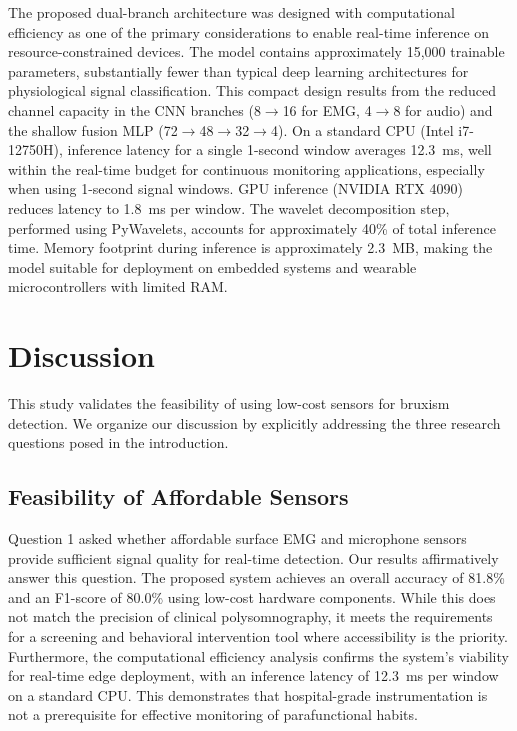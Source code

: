 \documentclass[acmtog, nonacm]{acmart}
\begin{document}
The proposed dual-branch architecture was designed with computational efficiency as one of the primary considerations to enable real-time inference on resource-constrained devices. The model contains approximately 15,000 trainable parameters, substantially fewer than typical deep learning architectures for physiological signal classification. This compact design results from the reduced channel capacity in the CNN branches (8$\rightarrow$16 for EMG, 4$\rightarrow$8 for audio) and the shallow fusion MLP (72$\rightarrow$48$\rightarrow$32$\rightarrow$4). On a standard CPU (Intel i7-12750H), inference latency for a single 1-second window averages 12.3~ms, well within the real-time budget for continuous monitoring applications, especially when using 1-second signal windows. GPU inference (NVIDIA RTX 4090) reduces latency to 1.8~ms per window. The wavelet decomposition step, performed using PyWavelets, accounts for approximately 40\% of total inference time. Memory footprint during inference is approximately 2.3~MB, making the model suitable for deployment on embedded systems and wearable microcontrollers with limited RAM.


\section{Discussion}

This study validates the feasibility of using low-cost sensors for bruxism detection. We organize our discussion by explicitly addressing the three research questions posed in the introduction.

\subsection{Feasibility of Affordable Sensors}
Question 1 asked whether affordable surface EMG and microphone sensors provide sufficient signal quality for real-time detection. Our results affirmatively answer this question. The proposed system achieves an overall accuracy of 81.8\% and an F1-score of 80.0\% using low-cost hardware components. While this does not match the precision of clinical polysomnography, it meets the requirements for a screening and behavioral intervention tool where accessibility is the priority. Furthermore, the computational efficiency analysis confirms the system's viability for real-time edge deployment, with an inference latency of 12.3~ms per window on a standard CPU. This demonstrates that hospital-grade instrumentation is not a prerequisite for effective monitoring of parafunctional habits.
\end{document}
